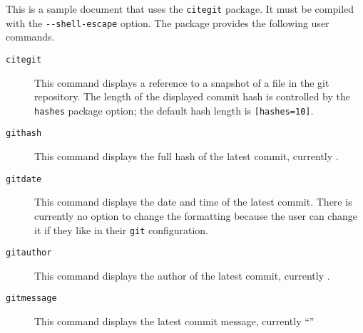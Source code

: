 \documentclass{article}
\begin{document}
	This is a sample document that uses the \verb+citegit+ package.
	It must be compiled with the \verb+--shell-escape+ option.
	The package provides the following user commands.
	\begin{description}
		\item[\texttt{citegit}]
		This command displays a reference to a snapshot of a file in the git
		repository.
		The length of the displayed commit hash is controlled by the \verb+hashes+
		package option; the default hash length is \verb+[hashes=10]+.
		\item[\texttt{githash}]
		This command displays the full hash of the latest commit, currently \texttt{\githash}.
		\item[\texttt{gitdate}]
		This command displays the date and time of the latest commit.
		There is currently no option to change the formatting because
		the user can change it if they like in their \verb+git+ configuration.
		\item[\texttt{gitauthor}]
		This command displays the author of the latest commit, currently
		\gitauthor.
		\item[\texttt{gitmessage}]
		This command displays the latest commit message, currently
		``\gitmessage''
	\end{description}
\end{document}
